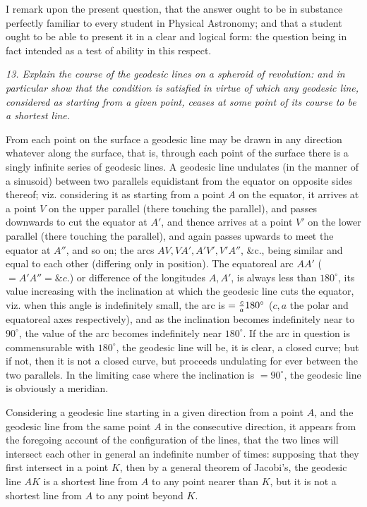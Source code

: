 \documentclass[11pt,a4paper]{article}
\theoremstyle{plain}
\theoremstyle{definition}
\begin{document}
I remark upon the present question, that the answer ought to be in substance perfectly familiar to every student in Physical Astronomy; and that a student ought to be able to present it in a clear and logical form: the question being in fact intended as a test of ability in this respect.

\newpage

\noindent\textit{13. Explain the course of the geodesic lines on a spheroid of revolution: and in particular show that the condition is satisfied in virtue of which any geodesic line, considered as starting from a given point, ceases at some point of its course to be a shortest line.}

From each point on the surface a geodesic line may be drawn in any direction whatever along the surface, that is, through each point of the surface there is a singly infinite series of geodesic lines. A geodesic line undulates (in the manner of a sinusoid) between two parallels equidistant from the equator on opposite sides thereof; viz. considering it as starting from a point $A$ on the equator, it arrives at a point $V$ on the upper parallel (there touching the parallel), and passes downwards to cut the equator at $A'$, and thence arrives at a point $V'$ on the lower parallel (there touching the parallel), and again passes upwards to meet the equator at $A''$, and so on; the arcs $AV,VA',A'V',V'A''$, \&c., being similar and equal to each other (differing only in position). The equatoreal arc $AA'$ ($=A'A''=\&c.$) or difference of the longitudes $A,A'$, is always less than $180^\circ$, its value increasing with the inclination at which the geodesic line cuts the equator, viz. when this angle is indefinitely small, the arc is $={c\over a}180^\circ$ ($c,a$ the polar and equatoreal axes respectively), and as the inclination becomes indefinitely near to $90^\circ$, the value of the arc becomes indefinitely near $180^\circ$. If the arc in question is commensurable with $180^\circ$, the geodesic line will be, it is clear, a closed curve; but if not, then it is not a closed curve, but proceeds undulating for ever between the two parallels. In the limiting case where the inclination is $=90^\circ$, the geodesic line is obviously a meridian.

Considering a geodesic line starting in a given direction from a point $A$, and the geodesic line from the same point $A$ in the consecutive direction, it appears from the foregoing account of the configuration of the lines, that the two lines will intersect each other in general an indefinite number of times: supposing that they first intersect in a point $K$, then by a general theorem of Jacobi's, the geodesic line $AK$ is a shortest line from $A$ to any point nearer than $K$, but it is not a shortest line from $A$ to any point beyond $K$.
\end{document}
